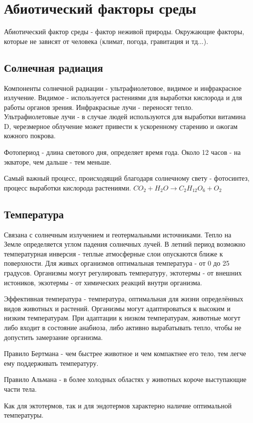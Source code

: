 \section{Абиотический факторы среды}
Абиотический фактор среды - фактор неживой природы. Окружающие факторы, которые не зависят от человека (климат, погода, гравитация и тд...).
\subsection{Солнечная радиация}
Компоненты солнечной радиации - ультрафиолетовое, видимое и инфракрасное излучение. Видимое - используется растениями для выработки кислорода и для работы органов зрения. Инфракрасные лучи - переносят тепло. Ультрафиолетовые лучи - в случае людей используются для выработки витамина D, черезмерное облучение может привести к ускоренному старению и ожогам кожного покрова. 

Фотопериод - длина светового дня, определяет время года. Около 12 часов - на экваторе, чем дальше - тем меньше. 

Самый важный процесс, происходящий благодаря солнечному свету - фотосинтез, процесс выработки кислорода растениями.
$CO_{2} + H_{2}O \rightarrow C_{2}H_{12}O_{6} + O_{2}$

\subsection{Температура}
Связана с солнечным излучением и геотермальными источниками. Тепло на Земле определяется углом падения солнечных лучей. В летний период возможно температурная инверсия - теплые атмосферные слои опускаются ближе к поверхности. Для живых организмов оптимальная температура - от 0 до 25 градусов. Организмы могут регулировать температуру, эктотермы - от внешних истоников, экзотермы - от химических реакций внутри организма.

Эффективная температура - температура, оптимальная для жизни определённых видов животных и растений. Организмы могут адаптироваться к высоким и низким температурам. При адаптации к низком температурам, животные могут либо входит в состояние анабиоза, либо активно вырабатывать тепло, чтобы не допустить замерзание организма.

Правило Бертмана - чем быстрее животное и чем компактнее его тело, тем легче ему поддерживать температуру.

Правило Альмана - в более холодных областях у животных короче выступающие части тела.

Как для эктотермов, так и для эндотермов характерно наличие оптимальной температуры.


